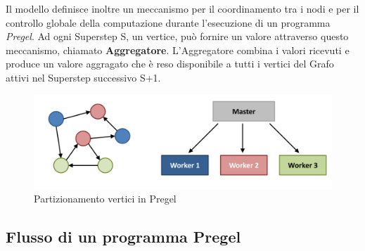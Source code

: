 \documentclass[LaM,binding=0.6cm]{sapthesis}
\begin{document}
Il modello definisce inoltre un meccanismo per il coordinamento tra i nodi e per il controllo globale della computazione durante l'esecuzione di un programma \textit{Pregel}. Ad ogni Superstep S, un vertice, può fornire un valore attraverso questo meccanismo, chiamato \textbf{Aggregatore}. L'Aggregatore combina i valori ricevuti e produce un valore aggragato che è reso disponibile a tutti i vertici del Grafo attivi nel Superstep successivo S+1.


\begin{figure}[b]
\centering
\includegraphics[width=1\textwidth]{partizionePregel}
\caption{Partizionamento vertici in Pregel}
\label{fig:partizPregel}
\end{figure}

\subsection{Flusso di un programma Pregel}
\end{document}

